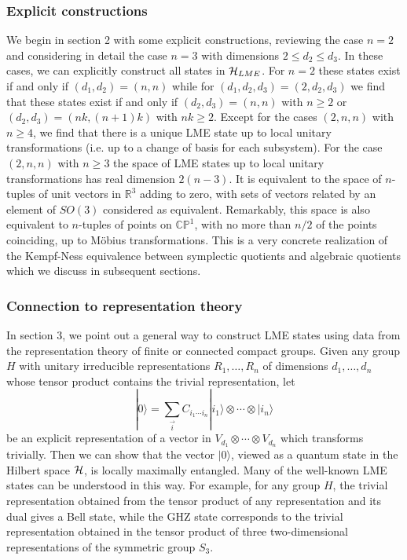 \documentclass[12pt]{article}
\theoremstyle{definition}
\newcommand{\be}{\begin{equation}}
\newcommand{\ee}{\end{equation}}
\begin{document}
\subsubsection{Explicit constructions}

We begin in section 2 with some explicit constructions, reviewing the
case $n=2$ and considering in detail the case $n=3$ with dimensions $2
\le d_2 \le d_3$. In these cases, we can explicitly construct all
states in ${\cal H}_{LME}$. For $n=2$ these states exist if and only
if $(d_1,d_2) = (n,n)$ while for $(d_1, d_2, d_3) = (2,d_2,d_3)$ we
find that these states exist if and only if $(d_2,d_3) = (n,n)$ with
$n \ge 2$ or $(d_2,d_3) = (nk,(n+1)k)$ with $nk \ge 2$. Except for the
cases $(2,n,n)$ with $n \ge 4$, we find that there is a unique LME
state up to local unitary transformations (i.e. up to a change of
basis for each subsystem). For the case $(2,n,n)$ with $n \ge 3$ the
space of LME states up to local unitary transformations has real
dimension $2(n-3)$. It is equivalent to the space of $n$-tuples of unit vectors in
$\mathbb{R}^3$ adding to zero, with sets of vectors related by an
element of $SO(3)$ considered as equivalent. Remarkably, this space is
also equivalent to $n$-tuples of points on $\mathbb{CP}^{1}$, with no
more than $n/2$ of the points coinciding, up to M\"obius
transformations. This is a very concrete realization of the
Kempf-Ness equivalence between symplectic quotients and algebraic
quotients which we discuss in subsequent sections.

\subsubsection{Connection to representation theory}

In section 3, we point out a general way to construct LME states using data from the representation theory of finite or connected compact groups. Given any group $H$ with unitary irreducible representations $R_1,\dots ,R_n$ of dimensions $d_1, \dots, d_n$ whose tensor product contains the trivial representation, let
\be
|0 \rangle = \sum_{\vec{i}} C_{i_1 \cdots i_n} |i_1 \rangle \otimes \cdots \otimes |i_n \rangle
\ee
be an explicit representation of a vector in $V_{d_1} \otimes \cdots \otimes V_{d_n}$ which transforms trivially. Then we can show that the vector $|0 \rangle$, viewed as a quantum state in the Hilbert space ${\cal H}$, is locally maximally entangled. Many of the well-known LME states can be understood in this way. For example, for any group $H$, the trivial representation obtained from the tensor product of any representation and its dual gives a Bell state, while the GHZ state corresponds to the trivial representation obtained in the tensor product of three two-dimensional representations of the symmetric group $S_3$.
\end{document}

